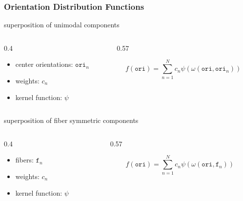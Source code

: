 \documentclass[compress,aspectratio=1610,fleqn]{beamer}
\begin{document}
\begin{frame}
  \frametitle{Orientation Distribution Functions}

   superposition of unimodal components
  \begin{columns}
    \begin{column}{0.4\textwidth}
      \begin{itemize}
      \item center orientations: $\mathtt{ori}_{n}$
      \item weights: $c_{n}$
      \item kernel function: $\psi$
      \end{itemize}
    \end{column}
    \begin{column}{0.57\textwidth}

      \begin{equation*}
        f(\mathtt{ori})
        = \sum_{n=1}^{N} c_{n} \psi(\omega(\mathtt{ori}, \mathtt{ori}_{n}))
      \end{equation*}
          \end{column}

  \end{columns}

  \pause
  \bigskip

   superposition of fiber symmetric components
    \begin{columns}
    \begin{column}{0.4\textwidth}
      \begin{itemize}
      \item fibers: $\mathtt{f}_{n}$
      \item weights: $c_{n}$
      \item kernel function: $\psi$
      \end{itemize}
    \end{column}
    \begin{column}{0.57\textwidth}

      \begin{equation*}
        f(\mathtt{ori})
        = \sum_{n=1}^{N} c_{n} \psi(\omega(\mathtt{ori}, \mathtt{f}_{n}))
      \end{equation*}
    \end{column}

  \end{columns}

  \pause
  \bigskip


\end{frame}
\end{document}
